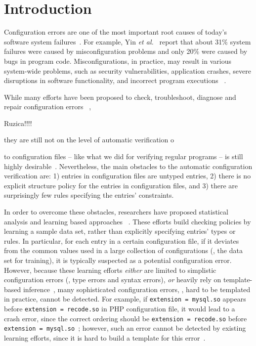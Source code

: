\section{Introduction}
\label{sec-intro}

Configuration errors are one of the most important root causes of
today's software system failures~\cite{xu15systems, yin11anempirical}.
For example, Yin {\em et al.}~\cite{yin11anempirical} report
that about 31\% system failures were caused by misconfiguration problems and only 20\% were caused by bugs in program code. 
Misconfigurations, in practice, may result in various
system-wide problems, such as security vulnerabilities, 
application crashes, severe disruptions in software
functionality, and incorrect program executions%
~\cite{zhang14encore, yuan11context, xu13do, xu15hey}.  

While many efforts have been proposed 
to check, troubleshoot, diagnose and repair configuration errors%
~\cite{attariyan10automating,
su07autobash, whitaker04configuration},


Ruzica!!!!

they are still not on the level of
automatic verification o

to configuration files -- like what we
did for verifying regular programs -- is still highly
desirable~\cite{wang04automatic, zhang14encore, xu15systems}.
Nevertheless, the main obstacles to the automatic 
configuration verification are:
1) entries in configuration files are untyped entries, 2) there
is no explicit structure policy for the entries in configuration
files, and 3) there are surprisingly few rules specifying the
entries' constraints.

In order to overcome these obstacles,
researchers have proposed 
statistical analysis and learning based approaches%
~\cite{wang04automatic, zhang14encore, yuan11context}. 
These efforts build checking policies by learning a sample 
data set, rather than explicitly specifying entries' types or rules.
In particular, for each entry in a certain configuration file, 
if it deviates from the common values used in a large collection
of configurations (\ie, the data set for training), it is typically
suspected as a potential configuration error.
However, because these learning 
efforts {\em either} are limited to simplistic 
configuration errors (\eg, type errors and syntax errors), 
{\em or} heavily rely on template-based inference~\cite{zhang14encore}, 
many sophisticated configuration errors, 
\eg, hard to be templated in practice, cannot be detected.
For example, if {\tt extension = mysql.so} appears 
before {\tt extension = recode.so} in PHP configuration file,  
it would lead to a crash error, since the correct ordering 
should be {\tt extension = recode.so} before 
{\tt extension = mysql.so}~\cite{yin11anempirical};
however, such an error cannot be detected by existing
learning efforts, since it is hard to build a template for this
error~\cite{xu15systems}.

